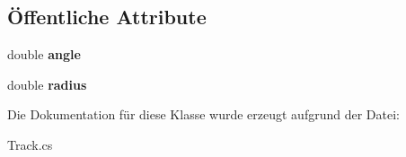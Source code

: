 \subsection*{Öffentliche Attribute}
\begin{DoxyCompactItemize}
\item 
\hypertarget{class_robot_ctrl_1_1_track_arc_left_a3d6fadeb6e8d2967178696601569b3d5}{
double {\bfseries angle}}
\label{class_robot_ctrl_1_1_track_arc_left_a3d6fadeb6e8d2967178696601569b3d5}

\item 
\hypertarget{class_robot_ctrl_1_1_track_arc_left_a74198f81576aa2160802c31d1b37c9c8}{
double {\bfseries radius}}
\label{class_robot_ctrl_1_1_track_arc_left_a74198f81576aa2160802c31d1b37c9c8}

\end{DoxyCompactItemize}


Die Dokumentation für diese Klasse wurde erzeugt aufgrund der Datei:\begin{DoxyCompactItemize}
\item 
Track.cs\end{DoxyCompactItemize}
